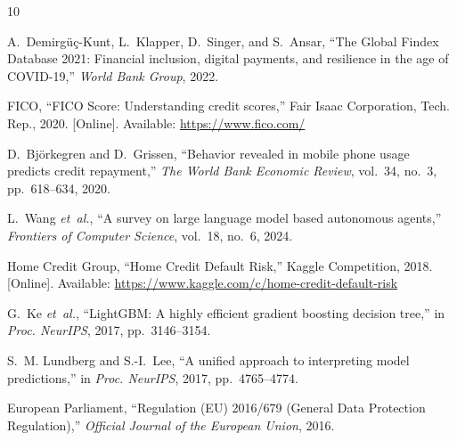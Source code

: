 \documentclass[12pt,a4paper]{article}
\begin{document}


\begin{thebibliography}{10}

A.~Demirgüç-Kunt, L.~Klapper, D.~Singer, and S.~Ansar, ``The Global Findex Database 2021: Financial inclusion, digital payments, and resilience in the age of COVID-19,'' \textit{World Bank Group}, 2022.

FICO, ``FICO Score: Understanding credit scores,'' Fair Isaac Corporation, Tech. Rep., 2020. [Online]. Available: \url{https://www.fico.com/}

D.~Björkegren and D.~Grissen, ``Behavior revealed in mobile phone usage predicts credit repayment,'' \textit{The World Bank Economic Review}, vol.~34, no.~3, pp.~618--634, 2020.

L.~Wang \textit{et~al.}, ``A survey on large language model based autonomous agents,'' \textit{Frontiers of Computer Science}, vol.~18, no.~6, 2024.

Home Credit Group, ``Home Credit Default Risk,'' Kaggle Competition, 2018. [Online]. Available: \url{https://www.kaggle.com/c/home-credit-default-risk}

G.~Ke \textit{et~al.}, ``LightGBM: A highly efficient gradient boosting decision tree,'' in \textit{Proc. NeurIPS}, 2017, pp.~3146--3154.

S.~M. Lundberg and S.-I.~Lee, ``A unified approach to interpreting model predictions,'' in \textit{Proc. NeurIPS}, 2017, pp.~4765--4774.

European Parliament, ``Regulation (EU) 2016/679 (General Data Protection Regulation),'' \textit{Official Journal of the European Union}, 2016.

\end{thebibliography}
\end{document}

